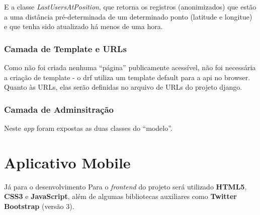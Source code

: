 E a classe \textit{LastUsersAtPosition}, que retorna os registros (anonimizados) que estão a uma distância pré-determinada de um determinado ponto (latitude e longitue) e que tenha sido atualizado há menos de uma hora.

\subsubsection{Camada de Template e URLs}
Como não foi criada nenhuma ``página'' publicamente acessível, não foi necessária a criação de template - o \gls{drf} utiliza um template default para a \gls{api} no browser. Quanto às URLs, elas serão definidas no arquivo de URLs do projeto \gls{django}.

\subsubsection{Camada de Adminsitração}
Neste \textit{app} foram expostas as duas classes do ``modelo''.


























\section{Aplicativo Mobile}\label{sec:spec-appmobile}

Já para o desenvolvimento Para o \textit{frontend} do projeto será utilizado \textbf{HTML5}, \textbf{CSS3} e \textbf{JavaScript}, além de algumas bibliotecas auxiliares como \textbf{Twitter Bootstrap} (versão 3).



